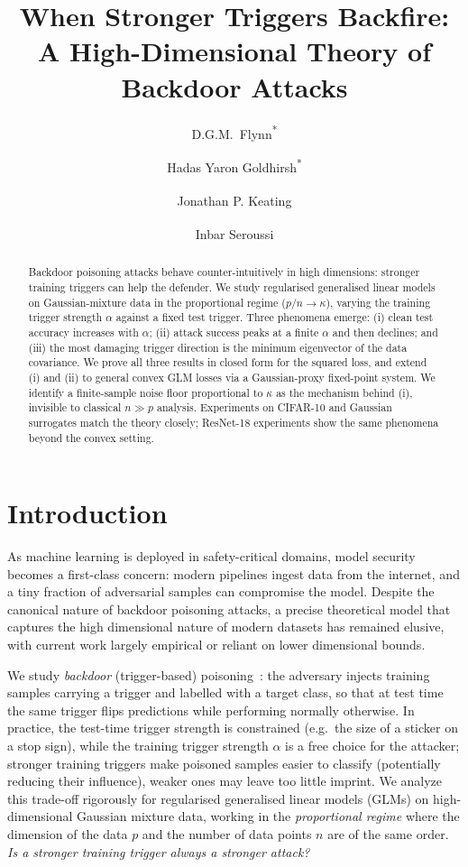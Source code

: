 \documentclass[11pt]{article}
\title{When Stronger Triggers Backfire:\\ A High-Dimensional Theory of Backdoor Attacks}
\author[1]{D.G.M.~Flynn\textsuperscript{*}}
\author[2]{Hadas Yaron Goldhirsh\textsuperscript{*}}
\author[1]{Jonathan P. Keating\textsuperscript{\dag}}
\author[3]{Inbar Seroussi\textsuperscript{\dag}}
\affil[1]{Mathematical Institute, University of Oxford}
\affil[2]{School of Mathematical Science, Tel Aviv University}
\affil[3]{School of Mathematical Science and Computer Science, Tel Aviv University}
\affil[ ]{\textsuperscript{*}Equal primary contribution.\quad \textsuperscript{\dag}Equal senior contribution.}
\date{}
\begin{document}

\maketitle


\begin{abstract}
Backdoor poisoning attacks behave counter-intuitively in
high dimensions: stronger training triggers can help the defender. We study
regularised generalised linear models on Gaussian-mixture data in the
proportional regime ($p/n \to \kappa$), varying the training trigger strength
$\alpha$ against a fixed test trigger. Three phenomena emerge: (i) clean test
accuracy increases with $\alpha$; (ii) attack success peaks at a finite
$\alpha$ and then declines; and (iii) the most damaging trigger direction is
the minimum eigenvector of the data covariance. We prove all three results in
closed form for the squared loss, and extend (i) and (ii) to general convex GLM
losses via a Gaussian-proxy fixed-point system. We identify a finite-sample
noise floor proportional to $\kappa$ as the mechanism behind (i), invisible to
classical $n \gg p$ analysis. Experiments on CIFAR-10 and Gaussian surrogates match the theory closely; ResNet-18 experiments show the same phenomena beyond the convex setting.
\end{abstract}

\section{Introduction}
As machine learning is deployed in safety-critical domains, model security becomes a first-class concern: modern pipelines ingest data from the internet, and a tiny fraction of adversarial samples can compromise the model. Despite the canonical nature of backdoor poisoning attacks, a precise theoretical model that captures the high dimensional nature of modern datasets has remained elusive, with current work largely empirical or reliant on lower dimensional bounds.

We study \emph{backdoor} (trigger-based) poisoning~\citep{gu_badnets_2019}: the adversary injects training samples carrying a trigger and labelled with a target class, so that at test time the same trigger flips predictions while performing normally otherwise. In practice, the test-time trigger strength is constrained (e.g.\ the size of a sticker on a stop sign), while the training trigger strength $\alpha$ is a free choice for the attacker; stronger training triggers make poisoned samples easier to classify (potentially reducing their influence), weaker ones may leave too little imprint. We analyze this trade-off rigorously for regularised generalised linear models (GLMs) on high-dimensional Gaussian mixture data, working in the \emph{proportional regime} where the dimension of the data $p$ and the number of data points $n$ are of the same order. \textit{Is a stronger training trigger always a stronger attack?}
\end{document}
